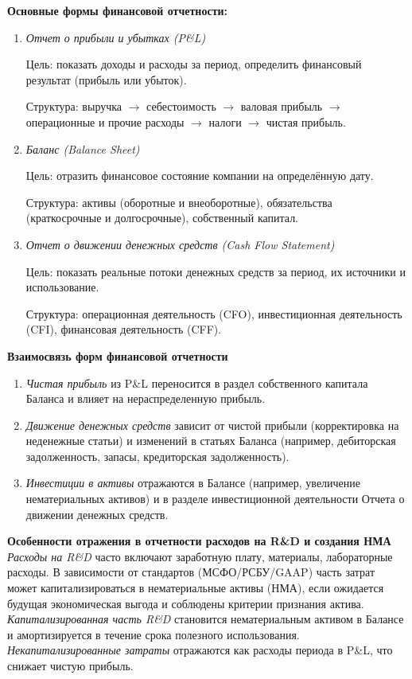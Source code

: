 \textbf{Основные формы финансовой отчетности:}
\begin{enumerate}
    \item \textit{Отчет о прибыли и убытках (P\&L)}
    
    Цель: показать доходы и расходы за период, определить финансовый результат (прибыль или убыток).
    
    Структура: выручка $\rightarrow$ себестоимость $\rightarrow$ валовая прибыль $\rightarrow$ операционные и прочие расходы $\rightarrow$ налоги $\rightarrow$ чистая прибыль.

    \item \textit{Баланс (Balance Sheet)}

    Цель: отразить финансовое состояние компании на определённую дату.
    
    Структура: активы (оборотные и внеоборотные), обязательства (краткосрочные и долгосрочные), собственный капитал.

    \item \textit{Отчет о движении денежных средств (Cash Flow Statement)}
    
    Цель: показать реальные потоки денежных средств за период, их источники и использование.
    
    Структура: операционная деятельность (CFO), инвестиционная деятельность (CFI), финансовая деятельность (CFF).
    
\end{enumerate}

\textbf{Взаимосвязь форм финансовой отчетности}

\begin{enumerate}
    \item \textit{Чистая прибыль} из P\&L переносится в раздел собственного капитала Баланса и влияет на нераспределенную прибыль.
    \item \textit{Движение денежных средств} зависит от чистой прибыли (корректировка на неденежные статьи) и изменений в статьях Баланса (например, дебиторская задолженность, запасы, кредиторская задолженность).
    \item \textit{Инвестиции в активы} отражаются в Балансе (например, увеличение нематериальных активов) и в разделе инвестиционной деятельности Отчета о движении денежных средств.
\end{enumerate}


\textbf{Особенности отражения в отчетности расходов на R\&D и создания НМА}
\textit{Расходы на R\&D} часто включают заработную плату, материалы, лабораторные расходы. В зависимости от стандартов (МСФО/РСБУ/GAAP) часть затрат может капитализироваться в нематериальные активы (НМА), если ожидается будущая экономическая выгода и соблюдены критерии признания актива.
\textit{Капитализированная часть R\&D} становится нематериальным активом в Балансе и амортизируется в течение срока полезного использования.
\textit{Некапитализированные затраты} отражаются как расходы периода в P\&L, что снижает чистую прибыль.



